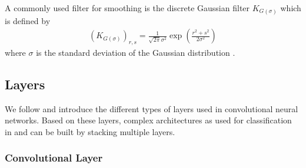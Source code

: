 A commonly used filter for smoothing is the discrete Gaussian filter $K_{G(\sigma)}$ \cite{ForsythPonce:2002} which is defined by
\begin{align}
	\label{eq:gaussian-filter}
	\left(K_{G(\sigma)}\right)_{r,s} = \frac{1}{\sqrt{2\pi}\sigma^2} \exp \left(\frac{r^2 + s^2}{2\sigma^2}\right)
\end{align}
where $\sigma$ is the standard deviation of the Gaussian distribution \cite{ForsythPonce:2002}.

\subsection{Layers}

We follow \cite{JarrettKavukcuogluRanzatoLeCun:2009} and introduce the different types of layers used in convolutional neural networks. Based on these layers, complex architectures as used for classification in \cite{CiresanMeierSchmidhuber:2012} and \cite{KrizhevskySutskeverHinton:2012} can be built by stacking multiple layers. %

\subsubsection{Convolutional Layer}

